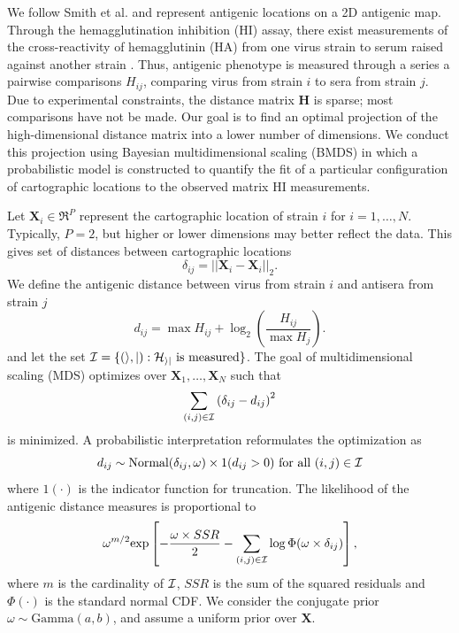 \documentclass[11pt,oneside,letterpaper]{article}
\begin{document}
We follow Smith et al. \cite{Smith04} and represent antigenic locations on a 2D antigenic map. 
Through the hemagglutination inhibition (HI) assay, there exist measurements of the cross-reactivity of hemagglutinin (HA) from one virus strain to serum raised against another strain \cite{Hirst43}. 
Thus, antigenic phenotype is measured through a series a pairwise comparisons $H_{ij}$, comparing virus from strain $i$ to sera from strain $j$. 
Due to experimental constraints, the distance matrix $\mathbf{H}$ is sparse; most comparisons have not be made. 
Our goal is to find an optimal projection of the high-dimensional distance matrix into a lower number of dimensions. 
We conduct this projection using Bayesian multidimensional scaling (BMDS) \cite{Oh01} in which a probabilistic model is constructed to quantify the fit of a particular configuration of cartographic locations to the observed matrix HI measurements.

Let $\mathbf{X}_i \in \Re^{P}$ represent the cartographic location of strain $i$ for $i = 1,\ldots, N$.
Typically, $P = 2$, but higher or lower dimensions may better reflect the data.  
This gives set of distances between cartographic locations 
\begin{equation}
	\delta_{ij} =  || \mathbf{X}_i - \mathbf{X}_i ||_2.
\end{equation}
We define the antigenic distance between virus from strain $i$ and antisera from strain $j$
\begin{equation}
	d_{ij} =  \max{ H_{ij} } + 
	\log_2 \left(   
		\frac{ H_{ij} }{ \max{ H_j } }
	\right).
\end{equation}
and let the set $\cal I = \{ (i,j) : H_{ij} \mbox{ is measured} \}$.
The goal of multidimensional scaling (MDS) optimizes over $\mathbf{X}_1,\ldots,\mathbf{X}_N$ such that
\begin{equation}
	\sum_{(i,j) \in \cal I} 
	\left(
		\delta_{ij} - d_{ij}
	\right)^2
\end{equation}
is minimized. 
A probabilistic interpretation reformulates the optimization as
\begin{equation} 
d_{ij} \sim \mbox{Normal}( \delta_{ij}, \omega ) \times 1( d_{ij} > 0 ) \mbox{ for all } (i,j) \in \cal I
\end{equation}
where $1 ( \cdot )$ is the indicator function for truncation. 
The likelihood of the antigenic distance measures is proportional to
\begin{equation}
\omega^{m/2} \mbox{exp} \left[
- \frac{\omega \times SSR}{2} - \sum_{(i,j) \in \cal I} \log \Phi (\omega \times \delta_{ij})
\right],
\end{equation}
where $m$ is the cardinality of $\cal I$, $SSR$ is the sum of the squared residuals and $\Phi(\cdot)$ is the standard normal CDF. 
We consider the conjugate prior $\omega \sim \mbox{Gamma}(a, b)$, and assume a uniform
prior over $\mathbf{X}$.
\end{document}
